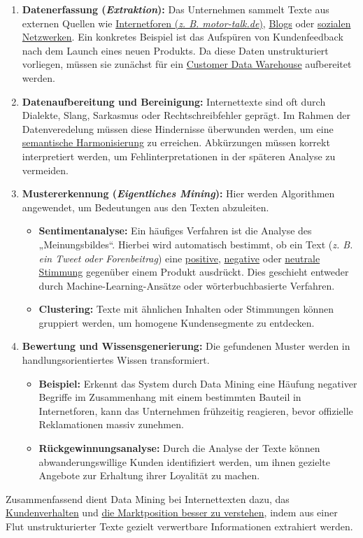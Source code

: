 \begin{enumerate}[label=\arabic*.), leftmargin=*]
    \item \textbf{Datenerfassung (\textit{Extraktion}):} Das Unternehmen sammelt Texte aus externen Quellen wie \uline{Internetforen (\textit{\acs{z. B.} motor-talk.de})}, \uline{Blogs} oder \uline{sozialen Netzwerken}. \cite{76}\cite{77} Ein konkretes Beispiel ist das Aufspüren von Kundenfeedback nach dem Launch eines neuen Produkts. \cite{77} Da diese Daten unstrukturiert vorliegen, müssen sie zunächst für ein \uline{Customer Data Warehouse} aufbereitet werden. \cite{78}\cite{79}
    \item \textbf{Datenaufbereitung und Bereinigung:} Internettexte sind oft durch Dialekte, Slang, Sarkasmus oder Rechtschreibfehler geprägt. \cite{80} Im Rahmen der Datenveredelung müssen diese Hindernisse überwunden werden, um eine \uline{semantische Harmonisierung} zu erreichen. \cite{81} Abkürzungen müssen korrekt interpretiert werden, um Fehlinterpretationen in der späteren Analyse zu vermeiden. \cite{80}
    \item \textbf{Mustererkennung (\textit{Eigentliches Mining}):} Hier werden Algorithmen angewendet, um Bedeutungen aus den Texten abzuleiten. \cite{73}
    \begin{itemize}
        \item \textbf{Sentimentanalyse:} Ein häufiges Verfahren ist die Analyse des „Meinungsbildes“. Hierbei wird automatisch bestimmt, ob ein Text (\textit{\acs{z. B.} ein Tweet oder Forenbeitrag}) eine \uline{positive}, \uline{negative} oder \uline{neutrale Stimmung} gegenüber einem Produkt ausdrückt. Dies geschieht entweder durch Machine-Learning-Ansätze oder wörterbuchbasierte Verfahren. \cite{80}
        \item \textbf{Clustering:} Texte mit ähnlichen Inhalten oder Stimmungen können gruppiert werden, um homogene Kundensegmente zu entdecken. \cite{82}\cite{83}
    \end{itemize}
    \item \textbf{Bewertung und Wissensgenerierung:} Die gefundenen Muster werden in handlungsorientiertes Wissen transformiert. \cite{84}\cite{85}
    \begin{itemize}
        \item \textbf{Beispiel:} Erkennt das System durch Data Mining eine Häufung negativer Begriffe im Zusammenhang mit einem bestimmten Bauteil in Internetforen, kann das Unternehmen frühzeitig reagieren, bevor offizielle Reklamationen massiv zunehmen. \cite{80}
        \item \textbf{Rückgewinnungsanalyse:} Durch die Analyse der Texte können abwanderungswillige Kunden identifiziert werden, um ihnen gezielte Angebote zur Erhaltung ihrer Loyalität zu machen. \cite{86}\cite{87}
    \end{itemize}
\end{enumerate}
Zusammenfassend dient Data Mining bei Internettexten dazu, das \uline{Kundenverhalten} und \uline{die Marktposition besser zu verstehen}, indem aus einer Flut unstrukturierter Texte gezielt verwertbare Informationen extrahiert werden. \cite{88}\cite{89}


